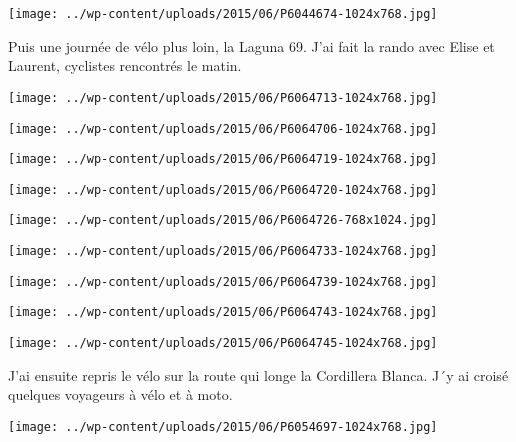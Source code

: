  \newline
 \newline
\centerline{\texttt{[image: ../wp-content/uploads/2015/06/P6044674-1024x768.jpg]} } 
 \newline
 Puis une journée de vélo plus loin, la Laguna 69. J'ai fait la rando avec Elise et Laurent, cyclistes rencontrés le matin. \newline
 \newline
\centerline{\texttt{[image: ../wp-content/uploads/2015/06/P6064713-1024x768.jpg]} } 
 \newline
 \newline
\centerline{\texttt{[image: ../wp-content/uploads/2015/06/P6064706-1024x768.jpg]} } 
 \newline
 \newline
\centerline{\texttt{[image: ../wp-content/uploads/2015/06/P6064719-1024x768.jpg]} } 
 \newline
 \newline
\centerline{\texttt{[image: ../wp-content/uploads/2015/06/P6064720-1024x768.jpg]} } 
 \newline
 \newline
\centerline{\texttt{[image: ../wp-content/uploads/2015/06/P6064726-768x1024.jpg]} } 
 \newline
 \newline
\centerline{\texttt{[image: ../wp-content/uploads/2015/06/P6064733-1024x768.jpg]} } 
 \newline
 \newline
\centerline{\texttt{[image: ../wp-content/uploads/2015/06/P6064739-1024x768.jpg]} } 
 \newline
 \newline
\centerline{\texttt{[image: ../wp-content/uploads/2015/06/P6064743-1024x768.jpg]} } 
 \newline
 \newline
\centerline{\texttt{[image: ../wp-content/uploads/2015/06/P6064745-1024x768.jpg]} } 
 \newline
 J'ai ensuite repris le vélo sur la route qui longe la Cordillera Blanca. J´y ai croisé quelques voyageurs à vélo et à moto. \newline
 \newline
\centerline{\texttt{[image: ../wp-content/uploads/2015/06/P6054697-1024x768.jpg]} } 
 \newline
